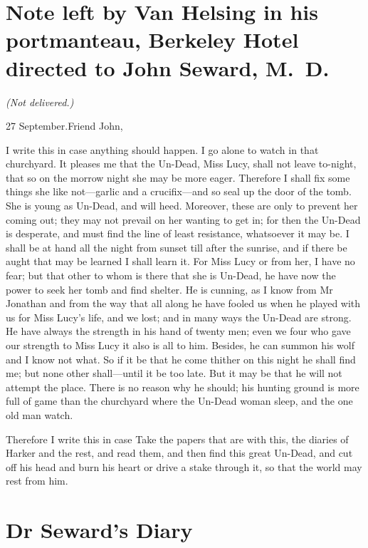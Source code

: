 \section{Note left by Van Helsing in his portmanteau, Berkeley Hotel directed to John Seward, M\@.~D\@.}
	\begin{center}\itshape (Not delivered.)\end{center}
	
	\begin{mail}{27 September.}{Friend John,}

I write this in case anything should happen. I go alone to watch in that churchyard. It pleases me that the Un-Dead, Miss Lucy, shall not leave to-night, that so on the morrow night she may be more eager. Therefore I shall fix some things she like not—garlic and a crucifix—and so seal up the door of the tomb. She is young as Un-Dead, and will heed. Moreover, these are only to prevent her coming out; they may not prevail on her wanting to get in; for then the Un-Dead is desperate, and must find the line of least resistance, whatsoever it may be. I shall be at hand all the night from sunset till after the sunrise, and if there be aught that may be learned I shall learn it. For Miss Lucy or from her, I have no fear; but that other to whom is there that she is Un-Dead, he have now the power to seek her tomb and find shelter. He is cunning, as I know from Mr Jonathan and from the way that all along he have fooled us when he played with us for Miss Lucy's life, and we lost; and in many ways the Un-Dead are strong. He have always the strength in his hand of twenty men; even we four who gave our strength to Miss Lucy it also is all to him. Besides, he can summon his wolf and I know not what. So if it be that he come thither on this night he shall find me; but none other shall—until it be too late. But it may be that he will not attempt the place. There is no reason why he should; his hunting ground is more full of game than the churchyard where the Un-Dead woman sleep, and the one old man watch.

Therefore I write this in case Take the papers that are with this, the diaries of Harker and the rest, and read them, and then find this great Un-Dead, and cut off his head and burn his heart or drive a stake through it, so that the world may rest from him.

\end{mail}

\section{Dr Seward's Diary}

